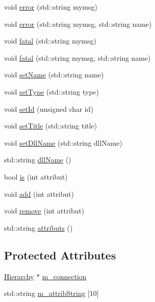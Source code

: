 \begin{DoxyCompactItemize}
\item 
void \hyperlink{classObject_a204a95f57818c0f811933917a30eff45}{error} (std::string mymsg)
\item 
void \hyperlink{classObject_ad7f6c457733082efa2f9ff5f5c8e119a}{error} (std::string mymsg, std::string name)
\item 
void \hyperlink{classObject_aad5a16aac7516ce65bd5ec02ab07fc80}{fatal} (std::string mymsg)
\item 
void \hyperlink{classObject_ae62acd3d09f716220f75f252dc38bc9a}{fatal} (std::string mymsg, std::string name)
\item 
void \hyperlink{classObject_ae30fea75683c2d149b6b6d17c09ecd0c}{setName} (std::string name)
\item 
void \hyperlink{classObject_aae534cc9d982bcb9b99fd505f2e103a5}{setType} (std::string type)
\item 
void \hyperlink{classObject_a398fe08cba594a0ce6891d59fe4f159f}{setId} (unsigned char id)
\item 
void \hyperlink{classObject_a89557dbbad5bcaa02652f5d7fa35d20f}{setTitle} (std::string title)
\item 
void \hyperlink{classObject_a870c5af919958c2136623b2d7816d123}{setDllName} (std::string dllName)
\item 
std::string \hyperlink{classObject_a2e3947f2870094c332d7454117f3ec63}{dllName} ()
\item 
bool \hyperlink{classAttrib_a704f26af560909ad22065083bb7d4c34}{is} (int attribut)
\item 
void \hyperlink{classAttrib_a235f773af19c900264a190b00a3b4ad7}{add} (int attribut)
\item 
void \hyperlink{classAttrib_a7d4ef7e32d93cb287792b87b857e79f3}{remove} (int attribut)
\item 
std::string \hyperlink{classAttrib_aee7bbf16b144887f196e1341b24f8a26}{attributs} ()
\end{DoxyCompactItemize}
\subsection*{Protected Attributes}
\begin{DoxyCompactItemize}
\item 
\hyperlink{classHierarchy}{Hierarchy} $\ast$ \hyperlink{classElement_abe3de7a5dbbc9a6dd2d7e012e5fdb266}{m\_\-connection}
\item 
std::string \hyperlink{classAttrib_a3414521d7a82476e874b25a5407b5e63}{m\_\-attribString} \mbox{[}10\mbox{]}
\end{DoxyCompactItemize}
